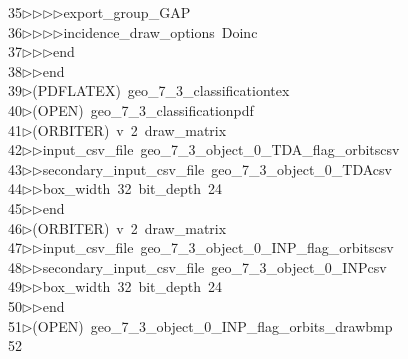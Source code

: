 \begin{tabbing}
35\>$\triangleright$\>$\triangleright$\>$\triangleright$\>$\triangleright$\>export\_group\_GAP\ \\[0pt]
36\>$\triangleright$\>$\triangleright$\>$\triangleright$\>$\triangleright$\>incidence\_draw\_options\ Doinc\ \\[0pt]
37\>$\triangleright$\>$\triangleright$\>$\triangleright$\>end\ \\[0pt]
38\>$\triangleright$\>$\triangleright$\>end\\[0pt]
39\>$\triangleright$\>(PDFLATEX)\ geo\_7\_3\_classificationtex\\[0pt]
40\>$\triangleright$\>(OPEN)\ geo\_7\_3\_classificationpdf\\[0pt]
41\>$\triangleright$\>(ORBITER)\ v\ 2\ draw\_matrix\ \\[0pt]
42\>$\triangleright$\>$\triangleright$\>input\_csv\_file\ geo\_7\_3\_object\_0\_TDA\_flag\_orbitscsv\ \\[0pt]
43\>$\triangleright$\>$\triangleright$\>secondary\_input\_csv\_file\ geo\_7\_3\_object\_0\_TDAcsv\ \\[0pt]
44\>$\triangleright$\>$\triangleright$\>box\_width\ 32\ bit\_depth\ 24\ \\[0pt]
45\>$\triangleright$\>$\triangleright$\>end\\[0pt]
46\>$\triangleright$\>(ORBITER)\ v\ 2\ draw\_matrix\ \\[0pt]
47\>$\triangleright$\>$\triangleright$\>input\_csv\_file\ geo\_7\_3\_object\_0\_INP\_flag\_orbitscsv\ \\[0pt]
48\>$\triangleright$\>$\triangleright$\>secondary\_input\_csv\_file\ geo\_7\_3\_object\_0\_INPcsv\ \\[0pt]
49\>$\triangleright$\>$\triangleright$\>box\_width\ 32\ bit\_depth\ 24\ \\[0pt]
50\>$\triangleright$\>$\triangleright$\>end\\[0pt]
51\>$\triangleright$\>(OPEN)\ geo\_7\_3\_object\_0\_INP\_flag\_orbits\_drawbmp\\[0pt]
52\>\end{tabbing}
